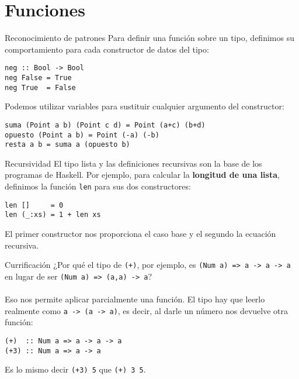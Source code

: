 \section{Funciones}

\begin{frame}[fragile]{Reconocimiento de patrones}
  Para definir una función sobre un tipo, definimos su comportamiento para cada
  constructor de datos del tipo:

  \espacio

  \begin{lstlisting}
neg :: Bool -> Bool
neg False = True
neg True  = False
  \end{lstlisting}

  \espacio
  
  Podemos utilizar variables para sustituir cualquier argumento del constructor:

  \espacio

  \begin{lstlisting}
suma (Point a b) (Point c d) = Point (a+c) (b+d)
opuesto (Point a b) = Point (-a) (-b)
resta a b = suma a (opuesto b)
  \end{lstlisting}
\end{frame}

\begin{frame}[fragile]{Recursividad}
  El tipo lista y las definiciones recursivas son la base de los programas de Haskell.
  Por ejemplo, para calcular la \textbf{longitud de una lista}, definimos la función
  \texttt{len} para sus dos constructores:

  \espacio

  \begin{lstlisting}
len []     = 0
len (_:xs) = 1 + len xs
  \end{lstlisting}

    \espacio

  El primer constructor nos proporciona el caso base y el segundo la ecuación recursiva.
\end{frame}

\begin{frame}[fragile]{Currificación}
  ¿Por qué el tipo de \texttt{(+)}, por ejemplo, es \texttt{(Num a) => a -> a -> a} en lugar de
  ser \texttt{(Num a) => (a,a) -> a}?
  \\~\\
  Eso nos permite aplicar parcialmente una función. El tipo hay que leerlo realmente como
  \texttt{a -> (a -> a)}, es decir, al darle un número nos devuelve otra función:
    \begin{lstlisting}
(+)  :: Num a => a -> a -> a
(+3) :: Num a => a -> a
  \end{lstlisting}
  Es lo mismo decir \texttt{(+3) 5} que \texttt{(+) 3 5}.
\end{frame}
